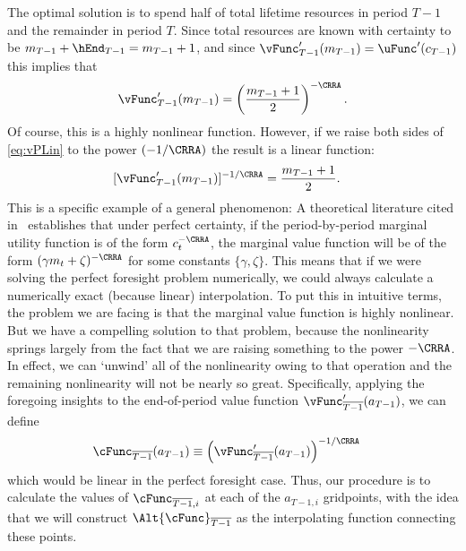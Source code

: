 \documentclass[titlepage, headings=optiontotocandhead]{\econtex}
\begin{document}
The optimal solution is to spend half of total lifetime resources in
period $T-1$ and the remainder in period $T$.  Since total resources
are known with certainty to be
${m}_{T-1}+\hEnd_{T-1}= {m}_{T-1}+1$, and since
${\vFunc}_{T-1}^{\prime}({m}_{T-1}) = \uFunc^{\prime}({c}_{T-1})$ this
implies that 
\begin{equation}
  \vFunc^{\prime}_{T-1}({m}_{T-1})  = \left(\frac{{m}_{T-1}+1}{2}\right)^{-\CRRA} \label{eq:vPLin}.
\end{equation}
Of course, this is a highly nonlinear
function.  However, if we raise both sides of \eqref{eq:vPLin} to the
power $(-1/\CRRA)$ the result is a linear function:
\begin{equation}\begin{gathered}\begin{aligned}
      [\vFunc^{\prime}_{T-1}({m}_{T-1})]^{-1/\CRRA}  & = \frac{{m}_{T-1}+1}{2}  .
    \end{aligned}\end{gathered}\end{equation}
This is a specific example of a general phenomenon: A theoretical
literature cited in~\cite{ckConcavity} establishes that under
perfect certainty, if the period-by-period marginal utility function
is of the form ${c}_{t}^{-\CRRA}$, the marginal value function will be
of the form $(\gamma {m}_{t}+\zeta)^{-\CRRA}$ for some constants
$\{\gamma,\zeta\}$.  This means that if we were solving the perfect
foresight problem numerically, we could always calculate a numerically
exact (because linear) interpolation.  To put this in intuitive terms,
the problem we are facing is that the marginal value function is
highly nonlinear.  But we have a compelling solution to that problem,
because the nonlinearity springs largely from the fact that we are raising
something to the power $-\CRRA$.  In effect, we can `unwind' all of
the nonlinearity owing to that operation and the remaining
nonlinearity will not be nearly so great.  Specifically, applying the foregoing insights
to the end-of-period value function $\vFunc^{\prime}_{\overline{T-1}}({a}_{T-1})$, we can define
\begin{equation}\begin{gathered}\begin{aligned}
      \cFunc_{\overline{T-1}}({a}_{T-1})  & \equiv  \left(\vFunc^{\prime}_{\overline{T-1}}({a}_{T-1})\right)^{-1/\CRRA} \label{eq:cGoth}
    \end{aligned}\end{gathered}\end{equation}
which would be linear in the perfect foresight case.  Thus, our
procedure is to calculate the values of $\cFunc_{\overline{T-1},i}$ at each
of the ${a}_{T-1,i}$ gridpoints, with the idea that we will construct
$\Alt{\cFunc}_{\overline{T-1}}$ as the interpolating function connecting
these
points.  %
\end{document}
